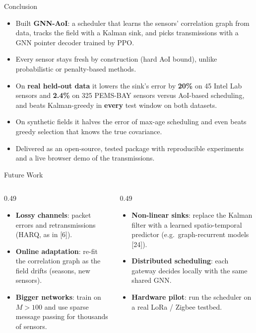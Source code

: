 \documentclass[aspectratio=169,10pt,xcolor=table]{beamer}
\newcommand{\good}[1]{{\color{good}\textbf{#1}}}
\renewcommand{\cite}[1]{{\color{muted}[#1]}}
\begin{document}
\begin{frame}{Conclusion}
  \begin{itemize}\setlength\itemsep{0.7em}
    \item Built \textbf{GNN-AoI}: a scheduler that learns the sensors' correlation graph from data, tracks the field with a
          Kalman sink, and picks transmissions with a GNN pointer decoder trained by PPO.
    \item Every sensor stays fresh by construction (hard AoI bound), unlike probabilistic or penalty-based methods.
    \item On \textbf{real held-out data} it lowers the sink's error by \good{20\%} on 45 Intel Lab sensors and
          \good{2.4\%} on 325 PEMS-BAY sensors versus AoI-based scheduling, and beats Kalman-greedy in
          \textbf{every} test window on both datasets.
    \item On synthetic fields it halves the error of max-age scheduling and even beats greedy selection that
          knows the true covariance.
    \item Delivered as an open-source, tested package with reproducible experiments and a live browser demo of
          the transmissions.
  \end{itemize}
\end{frame}

\begin{frame}{Future Work}
  \begin{columns}[T]
    \begin{column}{0.49\textwidth}
      \begin{itemize}\setlength\itemsep{0.6em}
        \item \textbf{Lossy channels}: packet errors and retransmissions (HARQ, as in \cite{6}).
        \item \textbf{Online adaptation}: re-fit the correlation graph as the field drifts (seasons, new sensors).
        \item \textbf{Bigger networks}: train on $M>100$ and use sparse message passing for thousands of sensors.
      \end{itemize}
    \end{column}
    \begin{column}{0.49\textwidth}
      \begin{itemize}\setlength\itemsep{0.6em}
        \item \textbf{Non-linear sinks}: replace the Kalman filter with a learned spatio-temporal predictor
              (e.g.\ graph-recurrent models \cite{24}).
        \item \textbf{Distributed scheduling}: each gateway decides locally with the same shared GNN.
        \item \textbf{Hardware pilot}: run the scheduler on a real LoRa / Zigbee testbed.
      \end{itemize}
    \end{column}
  \end{columns}
\end{frame}
\end{document}
